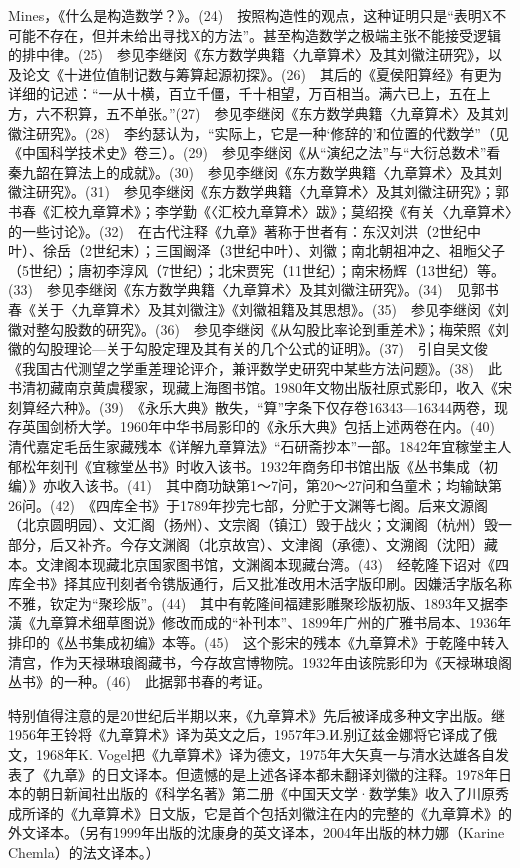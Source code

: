 \documentclass[12pt,UTF8]{ctexbook}
\begin{document}
Mines，《什么是构造数学？》。(24)　按照构造性的观点，这种证明只是“表明X不可能不存在，但并未给出寻找X的方法”。甚至构造数学之极端主张不能接受逻辑的排中律。(25)　参见李继闵《东方数学典籍〈九章算术〉及其刘徽注研究》，以及论文《十进位值制记数与筹算起源初探》。(26)　其后的《夏侯阳算经》有更为详细的记述：“一从十横，百立千僵，千十相望，万百相当。满六已上，五在上方，六不积算，五不单张。”(27)　参见李继闵《东方数学典籍〈九章算术〉及其刘徽注研究》。(28)　李约瑟认为，“实际上，它是一种‘修辞的’和位置的代数学”（见《中国科学技术史》卷三）。(29)　参见李继闵《从“演纪之法”与“大衍总数术”看秦九韶在算法上的成就》。(30)　参见李继闵《东方数学典籍〈九章算术〉及其刘徽注研究》。(31)　参见李继闵《东方数学典籍〈九章算术〉及其刘徽注研究》；郭书春《汇校九章算术》；李学勤《〈汇校九章算术〉跋》；莫绍揆《有关〈九章算术〉的一些讨论》。(32)　在古代注释《九章》著称于世者有：东汉刘洪（2世纪中叶）、徐岳（2世纪末）；三国阚泽（3世纪中叶）、刘徽；南北朝祖冲之、祖暅父子（5世纪）；唐初李淳风（7世纪）；北宋贾宪（11世纪）；南宋杨辉（13世纪）等。(33)　参见李继闵《东方数学典籍〈九章算术〉及其刘徽注研究》。(34)　见郭书春《关于〈九章算术〉及其刘徽注》《刘徽祖籍及其思想》。(35)　参见李继闵《刘徽对整勾股数的研究》。(36)　参见李继闵《从勾股比率论到重差术》；梅荣照《刘徽的勾股理论—关于勾股定理及其有关的几个公式的证明》。(37)　引自吴文俊《我国古代测望之学重差理论评介，兼评数学史研究中某些方法问题》。(38)　此书清初藏南京黄虞稷家，现藏上海图书馆。1980年文物出版社原式影印，收入《宋刻算经六种》。(39)　《永乐大典》散失，“算”字条下仅存卷16343—16344两卷，现存英国剑桥大学。1960年中华书局影印的《永乐大典》包括上述两卷在内。(40)　清代嘉定毛岳生家藏残本《详解九章算法》“石研斋抄本”一部。1842年宜稼堂主人郁松年刻刊《宜稼堂丛书》时收入该书。1932年商务印书馆出版《丛书集成（初编）》亦收入该书。(41)　其中商功缺第1～7问，第20～27问和刍童术；均输缺第26问。(42)　《四库全书》于1789年抄完七部，分贮于文渊等七阁。后来文源阁（北京圆明园）、文汇阁（扬州）、文宗阁（镇江）毁于战火；文澜阁（杭州）毁一部分，后又补齐。今存文渊阁（北京故宫）、文津阁（承德）、文溯阁（沈阳）藏本。文津阁本现藏北京国家图书馆，文渊阁本现藏台湾。(43)　经乾隆下诏对《四库全书》择其应刊刻者令镌版通行，后又批准改用木活字版印刷。因嫌活字版名称不雅，钦定为“聚珍版”。(44)　其中有乾隆间福建影雕聚珍版初版、1893年又据李潢《九章算术细草图说》修改而成的“补刊本”、1899年广州的广雅书局本、1936年排印的《丛书集成初编》本等。(45)　这个影宋的残本《九章算术》于乾隆中转入清宫，作为天禄琳琅阁藏书，今存故宫博物院。1932年由该院影印为《天禄琳琅阁丛书》的一种。(46)　此据郭书春的考证。




特别值得注意的是20世纪后半期以来，《九章算术》先后被译成多种文字出版。继1956年王铃将《九章算术》译为英文之后，1957年Э.И.别辽兹金娜将它译成了俄文，1968年K. Vogel把《九章算术》译为德文，1975年大矢真一与清水达雄各自发表了《九章》的日文译本。但遗憾的是上述各译本都未翻译刘徽的注释。1978年日本的朝日新闻社出版的《科学名著》第二册《中国天文学·数学集》收入了川原秀成所译的《九章算术》日文版，它是首个包括刘徽注在内的完整的《九章算术》的外文译本。（另有1999年出版的沈康身的英文译本，2004年出版的林力娜（Karine Chemla）的法文译本。）
\end{document}
